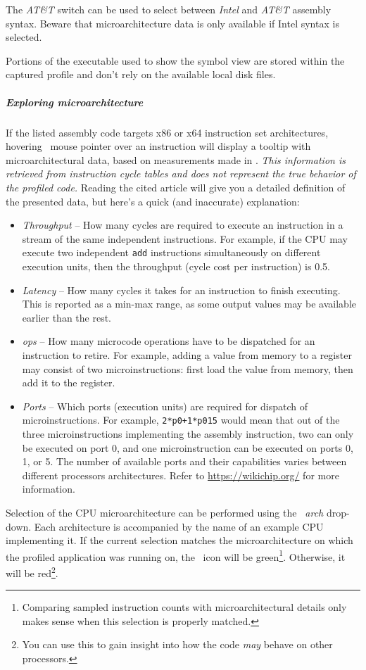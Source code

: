 \documentclass[hidelinks,titlepage,a4paper]{article}
\begin{document}
The \emph{AT\&T} switch can be used to select between \emph{Intel} and \emph{AT\&T} assembly syntax. Beware that microarchitecture data is only available if Intel syntax is selected.

Portions of the executable used to show the symbol view are stored within the captured profile and don't rely on the available local disk files.

\subparagraph{Exploring microarchitecture}

If the listed assembly code targets x86 or x64 instruction set architectures, hovering \faMousePointer{}~mouse pointer over an instruction will display a tooltip with microarchitectural data, based on measurements made in \cite{Abel19a}. \emph{This information is retrieved from instruction cycle tables and does not represent the true behavior of the profiled code.} Reading the cited article will give you a detailed definition of the presented data, but here's a quick (and inaccurate) explanation:

\begin{itemize}
\item \emph{Throughput} -- How many cycles are required to execute an instruction in a stream of the same independent instructions. For example, if the CPU may execute two independent \texttt{add} instructions simultaneously on different execution units, then the throughput (cycle cost per instruction) is 0.5.
\item \emph{Latency} -- How many cycles it takes for an instruction to finish executing. This is reported as a min-max range, as some output values may be available earlier than the rest.
\item \emph{\textmu{}ops} -- How many microcode operations have to be dispatched for an instruction to retire. For example, adding a value from memory to a register may consist of two microinstructions: first load the value from memory, then add it to the register.
\item \emph{Ports} -- Which ports (execution units) are required for dispatch of microinstructions. For example, \texttt{2*p0+1*p015} would mean that out of the three microinstructions implementing the assembly instruction, two can only be executed on port 0, and one microinstruction can be executed on ports 0, 1, or 5. The number of available ports and their capabilities varies between different processors architectures. Refer to \url{https://wikichip.org/} for more information.
\end{itemize}

Selection of the CPU microarchitecture can be performed using the \emph{\faMicrochip{}~\textmu{}arch} drop-down. Each architecture is accompanied by the name of an example CPU implementing it. If the current selection matches the microarchitecture on which the profiled application was running on, the \faMicrochip{}~icon will be green\footnote{Comparing sampled instruction counts with microarchitectural details only makes sense when this selection is properly matched.}. Otherwise, it will be red\footnote{You can use this to gain insight into how the code \emph{may} behave on other processors.}.
\end{document}
